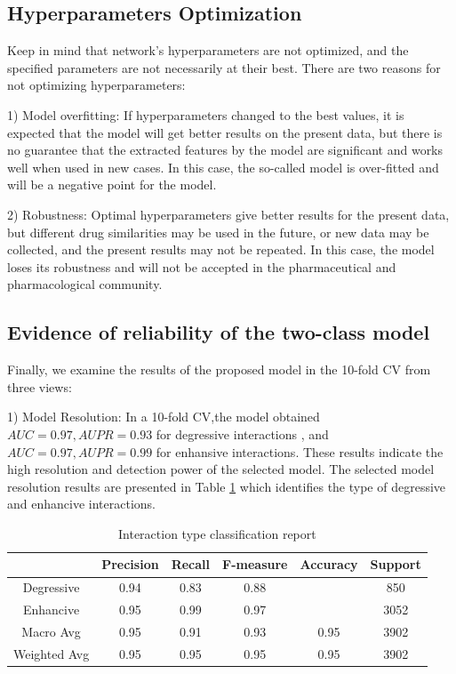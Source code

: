 \documentclass{bmcart}
\begin{document}
\subsection*{Hyperparameters Optimization}
Keep in mind that network's hyperparameters are not optimized, and the specified parameters are not necessarily at their best. There are two reasons for not optimizing hyperparameters:

1) Model overfitting: If hyperparameters changed to the best values, it is expected that the model will get better results on the present data, but there is no guarantee that the extracted features by the model are significant and works well when used in new cases. In this case, the so-called model is over-fitted and will be a negative point for the model.

2) Robustness: Optimal hyperparameters give better results for the present data, but different drug similarities may be used in the future, or new data may be collected, and the present results may not be repeated. In this case, the model loses its robustness and will not be accepted in the pharmaceutical and pharmacological community.

\subsection*{Evidence of reliability of the two-class model}   

Finally, we examine the results of the proposed model in the 10-fold CV from three views:

1) Model Resolution: In a 10-fold CV,the model obtained $AUC=0.97 , AUPR=0.93$ for degressive interactions , and $AUC=0.97,AUPR=0.99 $ for enhansive interactions. These results indicate the high resolution and detection power of the selected model. The selected model resolution results are presented in Table \ref{classificatonReport} which identifies the type of degressive and enhancive interactions.

\begin{table}[h!]
	\centering
	\begin{tabular}{|c|c|c|c|c|c|}
		\hline
		& Precision & Recall & F-measure & Accuracy& Support\\
		\hline
		Degressive & 0.94 & 0.83 & 0.88 && 850 \\
		\hline
		Enhancive & 0.95 & 0.99 & 0.97 && 3052 \\
		\hline
		Macro Avg & 0.95 & 0.91 & 0.93 &0.95& 3902\\
		\hline
		Weighted Avg & 0.95 & 0.95 &0.95 &0.95& 3902\\
		\hline
	\end{tabular}
	\newline
	\caption{Interaction type classification report}
	\label{classificatonReport}
\end{table}
\end{document}
